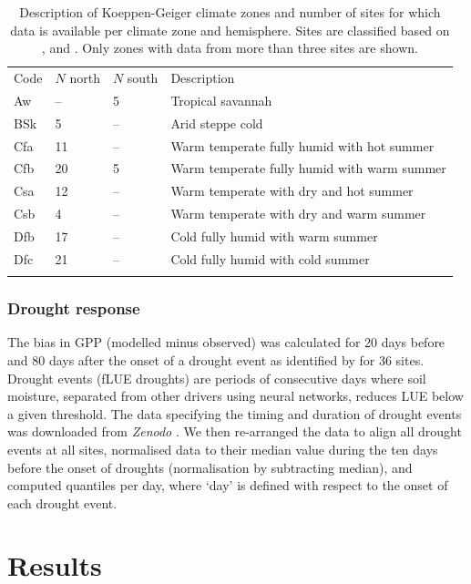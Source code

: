 \documentclass[gmd, manuscript]{copernicus}
\begin{document}
\begin{table}[t]
\caption{Description of Koeppen-Geiger climate zones and number of sites for which data is available per climate zone and hemisphere. Sites are classified based on \citet{falge17}, and \citet{beck18scidat}. Only zones with data from more than three sites are shown.}
\begin{tabular}{llll}
\tophline
  Code & $N$ north & $N$ south & Description \\ 
\middlehline
  Aw   & -- & 5  & Tropical savannah \\ 
  BSk  & 5 & --  & Arid steppe cold \\ 
  Cfa  & 11 & -- & Warm temperate fully humid with hot summer \\ 
  Cfb  & 20 & 5  & Warm temperate fully humid with warm summer \\ 
  Csa  & 12 & -- & Warm temperate with dry and hot summer \\ 
  Csb  & 4  & -- & Warm temperate with dry and warm summer \\ 
  Dfb  & 17 & -- & Cold fully humid with warm summer \\ 
  Dfc  & 21 & -- & Cold fully humid with cold summer \\ 
\bottomhline
\end{tabular}
\belowtable{} %
  \label{tab:kgclimate}
\end{table}


\subsubsection{Drought response}
\label{sec:droughtresponse}
The bias in GPP (modelled minus observed) was calculated for 20 days before and 80 days after the onset of a drought event as identified by \citet{stocker18newphyt} for 36 sites. Drought events (fLUE droughts) are periods of consecutive days where soil moisture, separated from other drivers using neural networks, reduces LUE below a given threshold. The data specifying the timing and duration of drought events was downloaded from \textit{Zenodo} \citep{flue}. We then re-arranged the data to align all drought events at all sites, normalised data to their median value during the ten days before the onset of droughts (normalisation by subtracting median), and computed quantiles per day, where `day' is defined with respect to the onset of each drought event.


\section{Results}
\label{sec:results}
\end{document}
